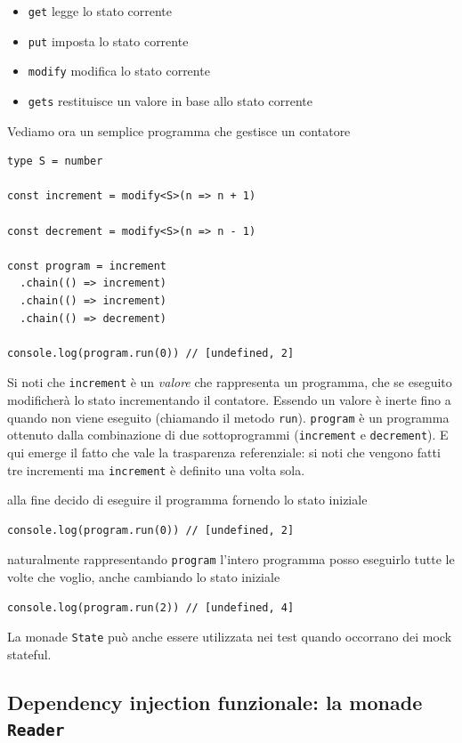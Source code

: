 \documentclass[12pt]{article}
\begin{document}
\begin{itemize}
  \item \texttt{get} legge lo stato corrente
  \item \texttt{put} imposta lo stato corrente
  \item \texttt{modify} modifica lo stato corrente
  \item \texttt{gets} restituisce un valore in base allo stato corrente
\end{itemize}

Vediamo ora un semplice programma che gestisce un contatore

\begin{verbatim}
type S = number

const increment = modify<S>(n => n + 1)

const decrement = modify<S>(n => n - 1)

const program = increment
  .chain(() => increment)
  .chain(() => increment)
  .chain(() => decrement)

console.log(program.run(0)) // [undefined, 2]
\end{verbatim}

Si noti che \texttt{increment} è un \emph{valore} che rappresenta un programma, che se eseguito
modificherà lo stato incrementando il contatore.
Essendo un valore è inerte fino a quando non viene eseguito (chiamando il metodo \texttt{run}).
\texttt{program} è un programma ottenuto dalla combinazione di due sottoprogrammi (\texttt{increment} e \texttt{decrement}).
E qui emerge il fatto che vale la trasparenza referenziale: si noti che vengono fatti tre incrementi
ma \texttt{increment} è definito una volta sola.

alla fine decido di eseguire il programma fornendo lo stato iniziale

\begin{verbatim}
console.log(program.run(0)) // [undefined, 2]
\end{verbatim}

naturalmente rappresentando \texttt{program} l'intero programma posso eseguirlo tutte le volte che voglio,
anche cambiando lo stato iniziale

\begin{verbatim}
console.log(program.run(2)) // [undefined, 4]
\end{verbatim}

La monade \texttt{State} può anche essere utilizzata nei test quando occorrano dei mock stateful.

\subsection{Dependency injection funzionale: la monade \texttt{Reader}}
\end{document}

